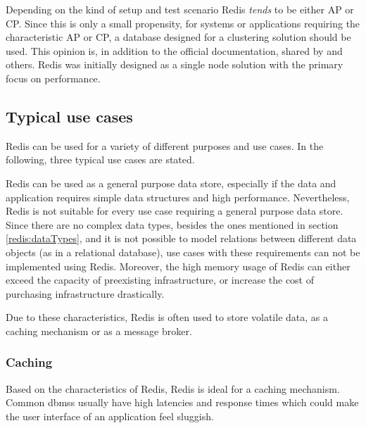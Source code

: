 Depending on the kind of setup and test scenario Redis \textit{tends} to be
either AP or CP. Since this is only a small propensity, for systems or applications
requiring the characteristic AP or CP, a database designed for a clustering
solution should be used. This opinion is, in addition to the official documentation,
shared by \cite{redis:davis2015} and others.
Redis was initially designed as a single node solution with the primary focus on
performance.

\subsection{Typical use cases}
Redis can be used for a variety of different purposes and use cases. In the
following, three typical use cases are stated.

Redis can be used as a general purpose data store, especially if the data and
application requires simple data structures and high performance.  Nevertheless,
Redis is not suitable for every use case requiring a general purpose data store.
Since there are no complex data types, besides the ones mentioned in section
\ref{redis:dataTypes}, and it is not possible to model relations between
different data objects (as in a relational database), use cases with these
requirements can not be implemented using Redis. Moreover, the high memory usage
of Redis can either exceed the capacity of preexisting infrastructure, or
increase the cost of purchasing infrastructure drastically.

Due to these characteristics, Redis is often used to store volatile data, as a
caching mechanism or as a message broker. \parencite{redis:commands, redis:introduction}

\subsubsection{Caching}
Based on the characteristics of Redis, Redis is ideal for a caching mechanism.
Common \glspl{dbms} usually have high latencies and response times which could
make the user interface of an application feel sluggish.

